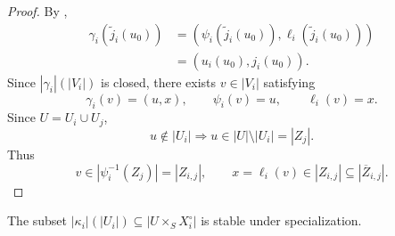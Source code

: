 \begin{proof}
  By ,
  \[
  \begin{aligned}
    \gamma_i(\widetilde j_i(u_0))
      &=(\psi_i(\widetilde j_i(u_0)),
          \ell_i(\widetilde j_i(u_0)))\\
      &=(u_i(u_0),j_i(u_0)).
  \end{aligned}
  \]
  Since $|\gamma_i|(|V_i|)$ is closed, there exists $v\in|V_i|$ satisfying
  \[
    \gamma_i(v)=(u,x),\qquad
    \psi_i(v)=u,\qquad \ell_i(v)=x.                               \tag{31}
  \]
  Since $U=U_i\cup U_j$,
  \[
    u\notin|U_i|\Longrightarrow u\in|U|\setminus|U_i|=|Z_j|.
  \]
  Thus
  \[
    v\in|\psi_i^{-1}(Z_j)|=|Z_{i,j}|,
    \qquad
    x=\ell_i(v)\in|Z_{i,j}|\subseteq|\overline Z_{i,j}|.
  \]
\end{proof}

\begin{lemma}
  \label{lemma:nagata-intermediate-overlap-specialization-closed}
  \lean{}

  The subset
  $|\kappa_i|(|U_i|)\subseteq|U\times_SX_i^\circ|$ is stable under
  specialization.
\end{lemma}

